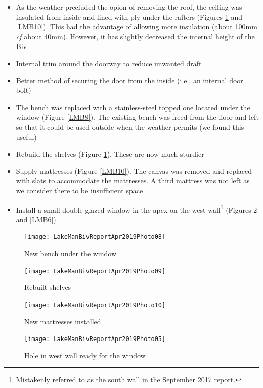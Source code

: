\documentclass[12pt]{article} %
\begin{document}
\begin{itemize}
 \item As the weather precluded the opion of removing the roof, the ceiling was insulated from inside and lined with ply under the rafters (Figures \ref{LMB9} and \ref{LMB10}).  This had the advantage of allowing more insulation (about 100mm \textit{cf} about 40mm).  However, it has slightly decreased the internal height of the Biv
 \item Internal trim around the doorway to reduce unwanted draft
 \item Better method of securing the door from the inside (i.e., an internal door bolt)
 \item The bench was replaced with a stainless-steel topped one located under the window (Figure \ref{LMB8}). The existing bench was freed from the floor and left so that it could be used outside when the weather permits (we found this useful)
 \item Rebuild the shelves (Figure \ref{LMB9}).  These are now much sturdier
 \item Supply mattresses (Figure \ref{LMB10}).  The canvas was removed and replaced with slats to accommodate the mattresses.  A third mattress was not left as we consider there to be insufficient space
 \item Install a small double-glazed window in the apex on the west wall\footnote{Mistakenly referred to as the south wall in the September 2017 report.} (Figures \ref{LMB5} and \ref{LMB6})
\end{itemize}

\begin{figure}[ht]
\begin{minipage}{.5\linewidth}
\begin{flushleft}
   \texttt{[image: LakeManBivReportApr2019Photo08]}
   \caption{New bench under the window}
   \label{LMB8}
\end{flushleft}
\end{minipage}
\begin{minipage}{.5\linewidth}
\begin{center}
   \texttt{[image: LakeManBivReportApr2019Photo09]}
   \caption{Rebuilt shelves}
   \label{LMB9}
\end{center}
\end{minipage}
\end{figure}

\begin{figure}[ht]
\begin{minipage}{.5\linewidth}
\begin{flushleft}
   \texttt{[image: LakeManBivReportApr2019Photo10]}
   \caption{New mattresses installed}
   \label{LMB10}
\end{flushleft}
\end{minipage}
\begin{minipage}{.5\linewidth}
\begin{center}
   \texttt{[image: LakeManBivReportApr2019Photo05]}
   \caption{Hole in west wall ready for the window}
   \label{LMB5}
\end{center}
\end{minipage}
\end{figure}
\end{document}
